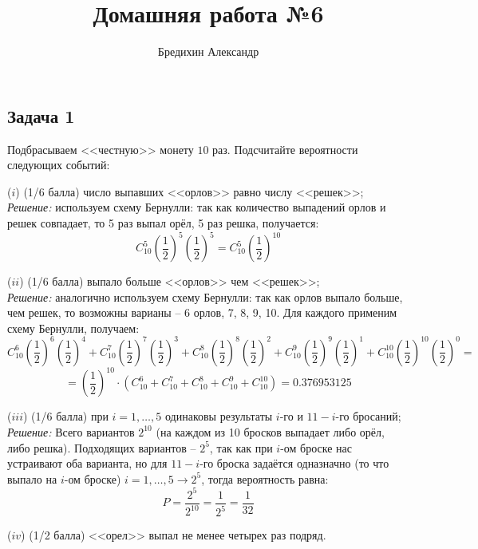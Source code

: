 \documentclass[a4paper,12pt]{article} %
\author{Бредихин Александр}
\title{Домашняя работа №6}
\begin{document}
\maketitle

\subsection*{Задача 1}

Подбрасываем <<честную>> монету $10$ раз. Подсчитайте вероятности следующих событий:

($i$) (1/6 балла)  число выпавших <<орлов>>  равно числу <<решек>>;\\

\textit{Решение:} используем схему Бернулли: так как количество выпадений орлов и решек совпадает, то 5 раз выпал орёл, 5 раз решка, получается:
$$
C_{10}^{5}\left(\frac{1}{2}\right)^{5}\left(\frac{1}{2}\right)^{5}=C_{10}^{5}\left(\frac{1}{2}\right)^{10}
$$

($ii$) (1/6 балла)  выпало больше <<орлов>>  чем <<решек>>;\\

\textit{Решение:} аналогично используем схему Бернулли: так как орлов выпало больше, чем решек, то возможны варианы -- 6 орлов, 7, 8, 9, 10. Для каждого применим схему Бернулли, получаем: 
$$
C_{10}^{6}\left(\frac{1}{2}\right)^{6}\left(\frac{1}{2}\right)^{4}+C_{10}^{7}\left(\frac{1}{2}\right)^{7}\left(\frac{1}{2}\right)^{3}+C_{10}^{8}\left(\frac{1}{2}\right)^{8}\left(\frac{1}{2}\right)^{2}+C_{10}^{9}\left(\frac{1}{2}\right)^{9}\left(\frac{1}{2}\right)^{1}+C_{10}^{10}\left(\frac{1}{2}\right)^{10}\left(\frac{1}{2}\right)^{0} =
$$
$$
= \left(\frac{1}{2}\right)^{10} \cdot \left(C_{10}^{6}+C_{10}^{7}+C_{10}^{8}+C_{10}^{9}+C_{10}^{10} \right) = 0.376953125
$$

($iii$) (1/6 балла) при $i=1,\dots,5$ одинаковы результаты $i$-го и $11-i$-го бросаний;\\

\textit{Решение:} Всего вариантов $ 2^{10} $ (на каждом из 10 бросков выпадает либо орёл, либо решка). Подходящих вариантов -- $ 2^5 $, так как при $i$-ом броске нас устраивают оба варианта, но для $11-i$-го броска задаётся одназначно (то что выпало на $i$-ом броске) $i=1,\dots,5 \longrightarrow 2^5$, тогда вероятность равна: 
$$
P = \frac{2^5}{2^{10}} = \frac{1}{2^5} = \frac{1}{32}
$$ 

($iv$) (1/2 балла) <<орел>> выпал не менее четырех раз подряд. \smallskip \\
\end{document}
